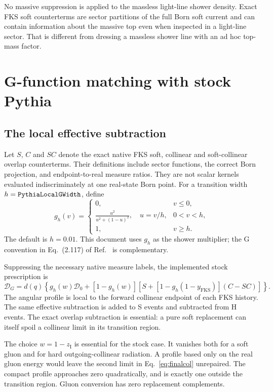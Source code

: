\documentclass[11pt,a4paper]{article}
\newcommand{\zI}{z_{\mathrm{I}}}
\newcommand{\DG}{\mathcal{D}_{G}}
\newcommand{\code}[1]{\texttt{\detokenize{#1}}}
\begin{document}
No massive suppression is applied to the massless light-line shower
density. Exact FKS soft counterterms are sector partitions of the full
Born soft current and can contain information about the massive top even
when inspected in a light-line sector. That is different from dressing a
massless shower line with an ad hoc top-mass factor.

\section{G-function matching with stock Pythia}\label{sec:G}

\subsection{The local effective subtraction}

Let $S$, $C$ and $SC$ denote the exact native FKS soft, collinear and
soft-collinear overlap counterterms. Their definitions include sector
functions, the correct Born projection, and endpoint-to-real measure ratios.
They are not scalar kernels evaluated indiscriminately at one real-state
Born point. For a transition width $h=\code{PythiaLocalGWidth}$, define
\begin{equation}
 g_h(v)=\begin{cases}
 0,&v\leq0,\\
 \displaystyle\frac{u^2}{u^2+(1-u)^2},\quad u=v/h,&0<v<h,\\
 1,&v\geq h.
 \end{cases}\label{eq:Gprofile}
\end{equation}
The default is $h=0.01$. This document uses $g_h$ as the shower multiplier;
the G convention in Eq.~(2.117) of Ref.~\cite{MG5} is complementary.

Suppressing the necessary native measure labels, the implemented stock
prescription is
\begin{equation}
 \boxed{\DG=d(q)\left\{
 g_h(w)\mathcal D_0+
 [1-g_h(w)]\left[S+[1-g_h(1-y_{\mathrm{FKS}})](C-SC)\right]\right\}.}
 \label{eq:DG}
\end{equation}
The angular profile is local to the forward collinear endpoint of each FKS
history. The same effective subtraction is added to S events and subtracted
from H events. The exact overlap subtraction is essential: a pure soft
replacement can itself spoil a collinear limit in its transition region.

The choice $w=1-\zI$ is essential for the stock case. It vanishes both for a
soft gluon and for hard outgoing-collinear radiation. A profile based only on
the real gluon energy would leave the second limit in
Eq.~\eqref{eq:finalcol} unrepaired. The compact profile approaches zero
quadratically, and is exactly one outside the transition region. Gluon
conversion has zero replacement complements.
\end{document}
